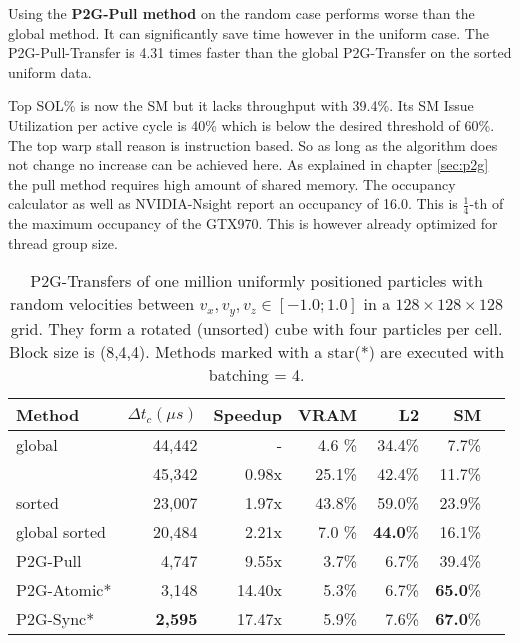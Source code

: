 \documentclass[m,times]{cgMA}
\begin{document}
Using the \textbf{P2G-Pull method} on the random case performs worse than the global method. It can significantly save time however in the uniform case. The P2G-Pull-Transfer is 4.31 times faster than the global P2G-Transfer on the sorted uniform data.

Top SOL\% is now the SM but it lacks throughput with 39.4\%. Its SM Issue Utilization per active cycle is 40\% which is below the desired threshold of 60\%. The top warp stall reason is instruction based. So as long as the algorithm does not change no increase can be achieved here. As explained in chapter \ref{sec:p2g} the pull method requires high amount of shared memory. The occupancy calculator as well as NVIDIA-Nsight report an occupancy of 16.0. This is $\frac{1}{4}$-th of the maximum occupancy of the GTX970. This is however already optimized for thread group size.

\begin{table}[htpb]
  \begin{tabular}{ | l | r | r | r | r | r | r |}    \hline
    Method                 &  $\Delta t_c(\mu s)$ &Speedup         &VRAM  & L2   &SM     \\\hline
    global                 &   44,442             &-               &4.6 \%&34.4\%&7.7\%  \\\hline
    \cite{Meyer2015}       &   45,342             &0.98x           &25.1\%&42.4\%&11.7\% \\\hline
    \cite{Meyer2015} sorted&   23,007		  &1.97x           &43.8\%&59.0\%&23.9\% \\\hline
    global sorted          &   20,484		  &2.21x           &7.0 \%&\textbf{44.0}\%&16.1\% \\\hline
    \hline
    P2G-Pull               &    4,747             &9.55x           &3.7\% &6.7\% &39.4\%\\\hline
    P2G-Atomic*		   &    3,148             &14.40x          &5.3\% &6.7\% &\textbf{65.0}\%\\\hline
    P2G-Sync*              &    \textbf{2,595}    &17.47x          &5.9\%&7.6\%  &\textbf{67.0}\%\\\hline
 \end{tabular}
 \caption{P2G-Transfers of one million uniformly positioned particles with random velocities between $v_x,v_y,v_z \in [-1.0;1.0]$ in a $128\times 128\times128$ grid. They form a rotated (unsorted) cube with four particles per cell. Block size is (8,4,4). Methods marked with a star(*) are executed with batching = 4.}\label{table:p2g_uniform4}
\end{table}
\end{document}
